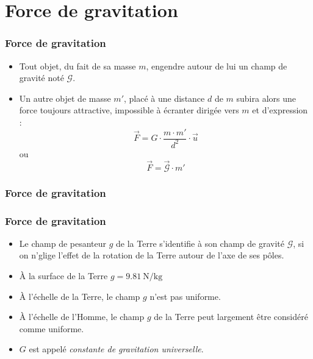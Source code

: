 \documentclass[aspectratio=43]{beamer}
\newenvironment{cours}[1][A retenir]{%
	\begin{basebox}[
		backgroundcolor=red!5,
		linecolor=red!75!black,
		frametitle={\color{red!75!black} #1}
		]
	}{\end{basebox}}
\begin{document}
\section{Force de gravitation}
    \begin{frame}
        \frametitle{Force de gravitation}
        \begin{itemize}
            \item Tout objet, du fait de sa masse $m$, engendre autour de lui un champ de gravité noté $\mathcal{G}$.
            \item Un autre objet de masse $m'$, placé à une distance $d$ de $m$ subira alors une force toujours attractive, impossible à écranter dirigée vers $m$ et d'expression : $$ \vec{F} = G\cdot \dfrac{m\cdot m'}{d^2}\cdot \vec{u}$$
            ou$$ \vec{F} = \vec{\mathcal{G}}\cdot m'$$
        \end{itemize}
    \end{frame}
    \begin{frame}
        \frametitle{Force de gravitation}
    \end{frame}

    \begin{frame}
        \frametitle{Force de gravitation}
        \begin{cours}
        \begin{itemize}
            \item Le champ de pesanteur $g$ de la Terre s'identifie à son champ de gravité $\mathcal{G}$, si on n'glige l'effet de la rotation de la Terre autour de l'axe de ses pôles.
            \item À la surface de la Terre $g = \SI{9,81}{\newton\per\kilo\gram}$
            \item À l'échelle de la Terre, le champ $g$ n'est pas uniforme.
            \item À l'échelle de l'Homme, le champ $g$ de la Terre peut largement être considéré comme uniforme.
            \item $G$ est appelé \emph{constante de gravitation universelle}.
        \end{itemize}
        \end{cours}
    \end{frame}
\end{document}
